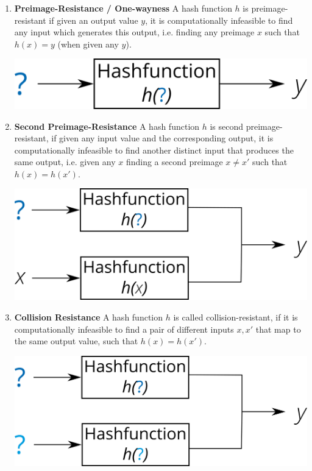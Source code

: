 \begin{enumerate} %
	\item \textbf{Preimage-Resistance / One-wayness}
	 A hash function $h$ is preimage-resistant if given an output value $y$, it is computationally infeasible to find any input which generates this output, i.e. finding any preimage $x$ such that $h(x) = y $ (when given any $y$). 

\begin{minipage}[t]{.5\linewidth}
          	\raggedright
            \includegraphics[width=.8\linewidth]{images/Background/preimage_res_horizontal.png}
	      \end{minipage} 

	\item \textbf{Second Preimage-Resistance}
	A hash function $h$ is second preimage-resistant, if given any input value and the corresponding output, it is computationally infeasible to find another distinct
input that produces the same output, i.e. given any $x$ finding a second preimage $x \neq x'$ such that $h(x) = h(x')$. %

\begin{minipage}[t]{.6\linewidth}
          	\raggedright
            \includegraphics[width=.8\linewidth]{images/Background/second_preimage_res_horizontal.png}
	      \end{minipage} 
	
	\item \textbf{Collision Resistance}
	A hash function $h$ is called collision-resistant, if it is computationally infeasible to find a pair of different inputs $x, x'$ that map to the same output value, such that $h(x) = h(x')$.


\begin{minipage}[t]{.6\linewidth}
          	\raggedright
            \includegraphics[width=.8\linewidth]{images/Background/collission_res_horizontal.png}
	      \end{minipage}
	      
\end{enumerate}	      


